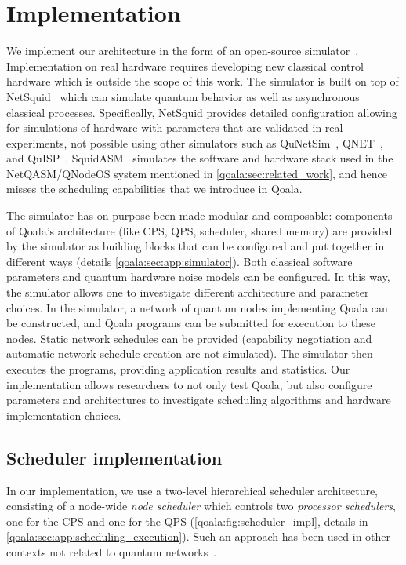 \section{Implementation}
\label{qoala:sec:implementation}
We implement our architecture in the form of an open-source simulator~\cite{qoala2023simulator}.
Implementation on real hardware requires developing new classical control hardware which is outside the scope of this work.
The simulator is built on top of NetSquid~\cite{coopmans2021netsquid} which can simulate quantum behavior as well as asynchronous classical processes.
Specifically, NetSquid provides detailed configuration allowing for simulations of hardware with parameters that are validated in real experiments, not possible using other simulators such as QuNetSim~\cite{diadamo2021qunetsim}, QNET~\cite{QNET}, and QuISP~\cite{satoh2022quisp}.
SquidASM~\cite{squidasmrepo} simulates the software and hardware stack used in the NetQASM/QNodeOS system mentioned in \cref{qoala:sec:related_work}, and hence misses the scheduling capabilities that we introduce in Qoala.

The simulator has on purpose been made modular and composable:
components of Qoala's architecture (like CPS, QPS, scheduler, shared memory) are provided by the simulator as building blocks that can be configured and put together in different ways (details \cref{qoala:sec:app:simulator}).
Both classical software parameters and quantum hardware noise models can be configured.
In this way, the simulator allows one to investigate different architecture and parameter choices.
In the simulator, a network of quantum nodes implementing Qoala can be constructed, and Qoala programs can be submitted for execution to these nodes.
Static network schedules can be provided (capability negotiation and automatic network schedule creation are not simulated).
The simulator then executes the programs, providing application results and statistics.
Our implementation allows researchers to not only test Qoala, but also configure parameters and architectures to investigate scheduling algorithms and hardware implementation choices.

\subsection{Scheduler implementation}
In our implementation, we use a two-level hierarchical scheduler architecture,
consisting of a node-wide \textit{node scheduler} which controls two \textit{processor schedulers}, one for the CPS and one for the QPS (\cref{qoala:fig:scheduler_impl}, details in \cref{qoala:sec:app:scheduling_execution}).
Such an approach has been used in other contexts not related to quantum networks~\cite{polychronopoulos1991hierarchical, girkar1994hierarchical}.

